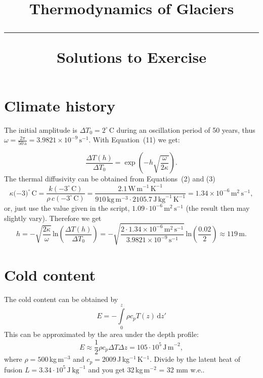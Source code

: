 \documentclass[DIV15,11pt,parskip=half]{scrartcl}
\newcommand{\unit}[1]{\ensuremath{\,\mathrm{#1}}}
\newcommand{\cels}[1]{\ensuremath{#1^{\circ}\,\mathrm{C}}}
\begin{document}
\vspace{-5em}

\title{Thermodynamics of Glaciers \\[.2em]
\rule[1em]{\textwidth}{2pt}
\LARGE\textsf{Solutions to Exercise}
}
\date{}

\maketitle


\vspace{-5em}


\section{Climate history}

The initial amplitude is $\Delta T_0 = \cels{2}$ during an oscillation period of 50 years, thus $\omega = \frac{2\pi}{50\,\text{a}} = 3.9821\times 10^{-9}\,\mathrm{s}^{-1}$. With Equation~(11) we get:

 \begin{equation*}
   \label{eq:temp-depth-amplitude}
   \frac{\Delta T(h)}{\Delta T_0}= \exp\left(-h \sqrt{\frac{\omega}{2\kappa}}\right).
 \end{equation*} The thermal diffusivity can be obtained from Equations~(2) and (3)
\begin{equation*}
\kappa(-\cels{3)} = \frac{k(-\cels{3})}{\rho\,c(-\cels{3})} = \frac{2.1\,\mathrm{W}\,\mathrm{m}^{-1}\,\mathrm{K}^{-1}}{910\,\mathrm{kg}\,\mathrm{m}^{-3} \cdot 2105.7\,\mathrm{J}\,\mathrm{kg}^{-1}\,\mathrm{K}^{-1}} = 1.34\times 10^{-6}\,\mathrm{m}^{2}\,\mathrm{s}^{-1}, 
\end{equation*} or, just use the value given in the script, $1.09\cdot 10^{-6}\unit{m}^{2}\unit{s}^{-1}$ (the result then may slightly vary).
Therefore we get
\begin{equation*}
  h = -\sqrt{\frac{2\kappa}{\omega}}\,\mathrm{ln}\left(\frac{\Delta T(h)}{\Delta T_0}\right)
  = - \sqrt{\frac{2\cdot 1.34\times 10^{-6}\,\mathrm{m}^{2}\,\mathrm{s}^{-1}}{3.9821\times 10^{-9}\,\mathrm{s}^{-1}}}\,\mathrm{ln}\left( \frac{0.02}{2}\right) \approx 119\,\mathrm{m}.
\end{equation*}

\section{Cold content}
 
The cold content can be obtained by
\begin{equation*}
E = -\int \limits_0^z \rho c_p T(z) \,\mathrm{d} z'
\end{equation*}
This can be approximated by the area under the depth profile:
\begin{equation*}
E \approx \frac{1}{2}\rho c_p\Delta T\Delta z = 105 \cdot 10^5\,\mathrm{J\,m}^{-2},
\end{equation*} where $\rho=500\,$kg\,m$^{-3}$ and $c_p=2009$\,J\,kg$^{-1}$\,K$^{-1}$.
Divide by the latent heat of fusion $L=3.34\cdot10^5\,\mathrm{J\,kg}^{-1}$ and you get 32\,kg\,m$^{-2}$ = 32 mm w.e..
\end{document}
